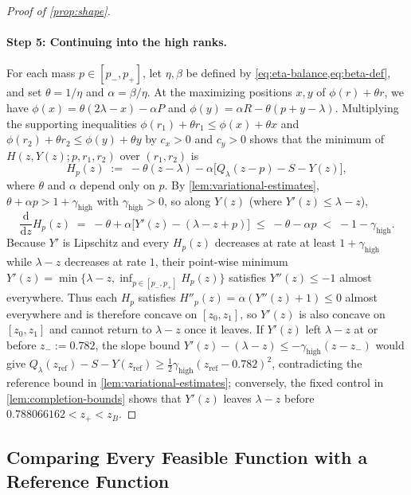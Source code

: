 \documentclass[11pt]{article}
\numberwithin{equation}{section}
\theoremstyle{plain}
\theoremstyle{definition}
\newcommand{\1}{\mathbf{1}}
\begin{document}
\begin{proof}[Proof of {\cref{prop:shape}}]
\paragraph{Step 5: Continuing into the high ranks.}
For each mass $p \in [p_-, p_+]$, let $\eta, \beta$ be defined by \cref{eq:eta-balance,eq:beta-def}, and set $\theta = 1/\eta$ and $\alpha = \beta/\eta$. At the maximizing positions $x, y$ of $\phi(r) + \theta r$, we have $\phi(x) = \theta(2\lambda - x) - \alpha P$ and $\phi(y) = \alpha R - \theta(p + y - \lambda)$. Multiplying the supporting inequalities $\phi(r_1) + \theta r_1 \le \phi(x) + \theta x$ and $\phi(r_2) + \theta r_2 \le \phi(y) + \theta y$ by $c_x > 0$ and $c_y > 0$ shows that the minimum of $H(z, Y(z); p, r_1, r_2)$ over $(r_1, r_2)$ is
\[
  H_p(z) \;:=\; -\theta(z - \lambda) - \alpha\bigl[Q_\lambda(z - p) - S - Y(z)\bigr],
\]
where $\theta$ and $\alpha$ depend only on $p$. By \cref{lem:variational-estimates}, $\theta + \alpha p > 1 + \gamma_{\mathrm{high}}$ with $\gamma_{\mathrm{high}} > 0$, so along $Y(z)$ (where $Y'(z) \le \lambda - z$),
\[
  \frac{\mathrm{d}}{\mathrm{d}z} H_p(z) \;=\; -\theta + \alpha\bigl[Y'(z) - (\lambda - z + p)\bigr] \;\le\; -\theta - \alpha p \;<\; -1 - \gamma_{\mathrm{high}}.
\]
Because $Y'$ is Lipschitz and every $H_p(z)$ decreases at rate at least $1 + \gamma_{\mathrm{high}}$ while $\lambda - z$ decreases at rate $1$, their point-wise minimum $Y'(z) = \min\bigl\{\lambda - z, \inf_{p \in [p_-, p_+]} H_p(z)\bigr\}$ satisfies $Y''(z) \le -1$ almost everywhere. Thus each $H_p$ satisfies $H''_p(z) = \alpha(Y''(z) + 1) \le 0$ almost everywhere and is therefore concave on $[z_0, z_1]$, so $Y'(z)$ is also concave on $[z_0, z_1]$ and cannot return to $\lambda - z$ once it leaves. If $Y'(z)$ left $\lambda - z$ at or before $z_- := 0.782$, the slope bound $Y'(z) - (\lambda - z) \le -\gamma_{\mathrm{high}}(z - z_-)$ would give $Q_\lambda(z_{\mathrm{ref}}) - S - Y(z_{\mathrm{ref}}) \ge \frac{1}{2}\gamma_{\mathrm{high}}(z_{\mathrm{ref}} - 0.782)^2$, contradicting the reference bound in \cref{lem:variational-estimates}; conversely, the fixed control in \cref{lem:completion-bounds} shows that $Y'(z)$ leaves $\lambda - z$ before $0.788066162 < z_+ < z_B$.
\end{proof}

\subsection{Comparing Every Feasible Function with a Reference Function}
\label{sec:reference-comparison}
\end{document}
